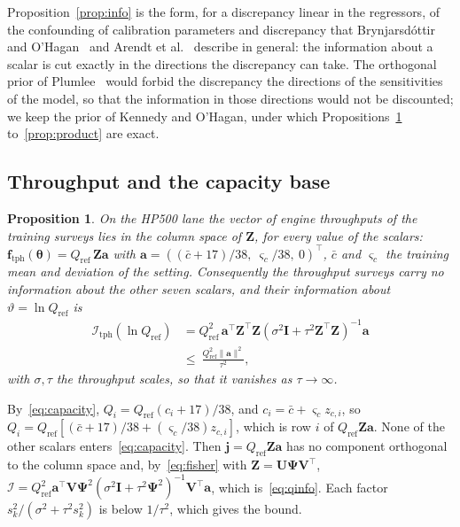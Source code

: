 \documentclass[journal]{IEEEtran}
\newtheorem{proposition}{Proposition}
\begin{document}
Proposition~\ref{prop:info} is the form, for a discrepancy linear in the regressors, of the confounding of calibration
parameters and discrepancy that Brynjarsd\'ottir and O'Hagan~\cite{brynj} and Arendt et al.~\cite{arendt} describe in
general: the information about a scalar is cut exactly in the directions the discrepancy can take. The orthogonal prior of
Plumlee~\cite{plumlee} would forbid the discrepancy the directions of the sensitivities of the model, so that the
information in those directions would not be discounted; we keep the prior of Kennedy and O'Hagan, under which Propositions~\ref{prop:span}
to~\ref{prop:product} are exact.

\subsection{Throughput and the capacity base}

\begin{proposition}\label{prop:span}
On the HP500 lane the vector of engine throughputs of the training surveys lies in the column space of $\mathbf Z$, for
every value of the scalars: $\mathbf f_{\mathrm{tph}}(\boldsymbol\theta)=Q_{\mathrm{ref}}\,\mathbf Z\mathbf a$ with
$\mathbf a=((\bar c+17)/38,\ \varsigma_c/38,\ 0)^{\top}$, $\bar c$ and $\varsigma_c$ the training mean and deviation of the setting.
Consequently the throughput surveys carry no information about the other seven scalars, and their information about
$\vartheta=\ln Q_{\mathrm{ref}}$ is
\begin{align}
\mathcal I_{\mathrm{tph}}(\ln Q_{\mathrm{ref}})&=Q_{\mathrm{ref}}^2\,\mathbf a^{\top}\mathbf Z^{\top}\mathbf Z\left(\sigma^2\mathbf I+\tau^2\mathbf Z^{\top}\mathbf Z\right)^{-1}\mathbf a\nonumber\\
&\le\ \frac{Q_{\mathrm{ref}}^2\|\mathbf a\|^2}{\tau^2},
\label{eq:qinfo}
\end{align}
with $\sigma,\tau$ the throughput scales, so that it vanishes as $\tau\to\infty$.
\end{proposition}
\begin{IEEEproof}
By~\eqref{eq:capacity}, $Q_i=Q_{\mathrm{ref}}(c_i+17)/38$, and $c_i=\bar c+\varsigma_cz_{c,i}$, so
$Q_i=Q_{\mathrm{ref}}[(\bar c+17)/38+(\varsigma_c/38)z_{c,i}]$, which is row $i$ of $Q_{\mathrm{ref}}\mathbf Z\mathbf a$. None of the
other scalars enters~\eqref{eq:capacity}. Then $\mathbf j=Q_{\mathrm{ref}}\mathbf Z\mathbf a$ has no component orthogonal to the
column space and, by~\eqref{eq:fisher} with $\mathbf Z=\mathbf U\boldsymbol\Psi\mathbf V^{\top}$, $\mathcal I=Q_{\mathrm{ref}}^2\mathbf
a^{\top}\mathbf V\boldsymbol\Psi^2(\sigma^2\mathbf I+\tau^2\boldsymbol\Psi^2)^{-1}\mathbf V^{\top}\mathbf a$, which is~\eqref{eq:qinfo}. Each
factor $s_k^2/(\sigma^2+\tau^2s_k^2)$ is below $1/\tau^2$, which gives the bound.
\end{IEEEproof}
\end{document}
